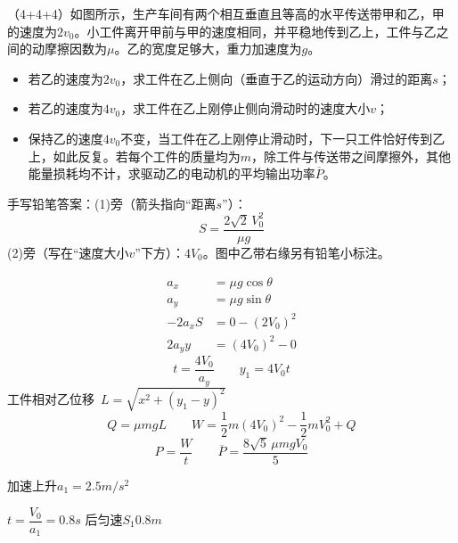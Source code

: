 \begin{problem}[贴纸印刷题]
（4+4+4）如图所示，生产车间有两个相互垂直且等高的水平传送带甲和乙，甲的速度为$2v_0$。小工件离开甲前与甲的速度相同，并平稳地传到乙上，工件与乙之间的动摩擦因数为$\mu$。乙的宽度足够大，重力加速度为$g$。
\begin{itemize}
\item[(1)] 若乙的速度为$2v_0$，求工件在乙上侧向（垂直于乙的运动方向）滑过的距离$s$；
\item[(2)] 若乙的速度为$4v_0$，求工件在乙上刚停止侧向滑动时的速度大小$v$；
\item[(3)] 保持乙的速度$4v_0$不变，当工件在乙上刚停止滑动时，下一只工件恰好传到乙上，如此反复。若每个工件的质量均为$m$，除工件与传送带之间摩擦外，其他能量损耗均不计，求驱动乙的电动机的平均输出功率$\overline{P}$。
\end{itemize}


手写铅笔答案：(1)旁（箭头指向“距离$s$”）：
\[
S=\frac{2\sqrt2\,V_0^2}{\mu g}
\]
(2)旁（写在“速度大小$v$”下方）：$4V_0$。图中乙带右缘另有铅笔小标注。

\begin{solution}
\begin{align*}
a_x&=\mu g\cos\theta\\
a_y&=\mu g\sin\theta\\
-2a_xS&=0-(2V_0)^2\\
2a_yy&=(4V_0)^2-0
\end{align*}
\[
t=\frac{4V_0}{a_y}\qquad y_1=4V_0t
\]
工件相对乙位移\ $L=\sqrt{x^2+(y_1-y)^2}$
\[
Q=\mu mgL\qquad W=\frac{1}{2}m(4V_0)^2-\frac{1}{2}mV_0^2+Q
\] %
\[
P=\frac{W}{t}\qquad \overline{P}=\frac{8\sqrt5\,\mu mgV_0}{5}
\]
\end{solution}
\end{problem}

{}


加速上升\quad $a_1=2.5\unit{m/s^2}$

$t=\dfrac{V_0}{a_1}=0.8\unit{s}$ 后匀速\quad $S_1$\quad $0.8\unit{m}$

